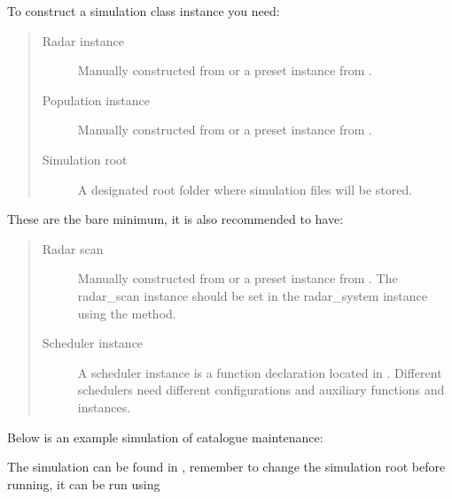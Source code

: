 \documentclass[letterpaper,10pt,english]{sphinxmanual}
\begin{document}
To construct a simulation class instance you need:
\begin{quote}\begin{description}
\item[{Radar instance}] \leavevmode
Manually constructed from  or a preset instance from {\hyperref[\detokenize{modules/radar_library:module-radar_library}]{}}.

\item[{Population instance}] \leavevmode
Manually constructed from  or a preset instance from {\hyperref[\detokenize{modules/population:module-population}]{}}.

\item[{Simulation root}] \leavevmode
A designated root folder where simulation files will be stored.

\end{description}\end{quote}

These are the bare minimum, it is also recommended to have:
\begin{quote}\begin{description}
\item[{Radar scan}] \leavevmode
Manually constructed from  or a preset instance from {\hyperref[\detokenize{modules/radar_scan_library:module-radar_scan_library}]{}}. The radar\_scan instance should be set in the radar\_system instance using the  method.

\item[{Scheduler instance}] \leavevmode
A scheduler instance is a function declaration located in {\hyperref[\detokenize{modules/scheduler_library:module-scheduler_library}]{}}. Different schedulers need different configurations and auxiliary functions and instances.

\end{description}\end{quote}

Below is an example simulation of catalogue maintenance:

The simulation can be found in , remember to change the simulation root before running, it can be run using
\end{document}
